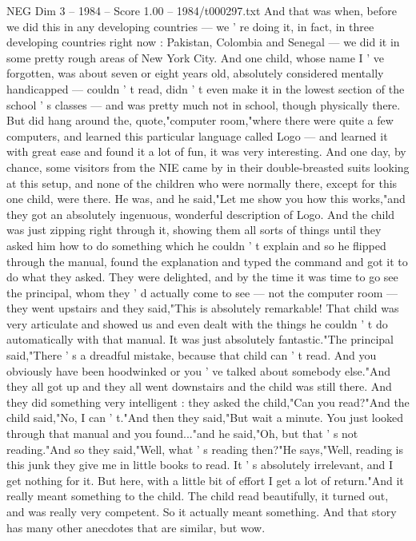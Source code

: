 \begin{textsample}{NEG Dim 3 – 1984 – Score 1.00 – 1984/t000297.txt}
And that was when, before we did this in any developing countries — we ' re doing it, in fact, in three developing countries right now : Pakistan, Colombia and Senegal — we did it in some pretty rough areas of New York City.
And one child, whose name I ' ve forgotten, was about seven or eight years old, absolutely considered mentally handicapped — couldn ' t read, didn ' t even make it in the lowest section of the school ' s classes — and was pretty much not in school, though physically there.
But did hang around the, quote,"computer room,"where there were quite a few computers, and learned this particular language called Logo — and learned it with great ease and found it a lot of fun, it was very interesting.
And one day, by chance, some visitors from the NIE came by in their double-breasted suits looking at this setup, and none of the children who were normally there, except for this one child, were there.
He was, and he said,"Let me show you how this works,"and they got an absolutely ingenuous, wonderful description of Logo.
And the child was just zipping right through it, showing them all sorts of things until they asked him how to do something which he couldn ' t explain and so he flipped through the manual, found the explanation and typed the command and got it to do what they asked.
They were delighted, and by the time it was time to go see the principal, whom they ' d actually come to see — not the computer room — they went upstairs and they said,"This is absolutely remarkable!
That child was very articulate and showed us and even dealt with the things he couldn ' t do automatically with that manual.
It was just absolutely fantastic."The principal said,"There ' s a dreadful mistake, because that child can ' t read.
And you obviously have been hoodwinked or you ' ve talked about somebody else."And they all got up and they all went downstairs and the child was still there.
And they did something very intelligent : they asked the child,"Can you read?"And the child said,"No, I can ' t."And then they said,"But wait a minute.
You just looked through that manual and you found..."and he said,"Oh, but that ' s not reading."And so they said,"Well, what ' s reading then?"He says,"Well, reading is this junk they give me in little books to read.
It ' s absolutely irrelevant, and I get nothing for it.
But here, with a little bit of effort I get a lot of return."And it really meant something to the child.
The child read beautifully, it turned out, and was really very competent.
So it actually meant something.
And that story has many other anecdotes that are similar, but wow.

\end{textsample}
